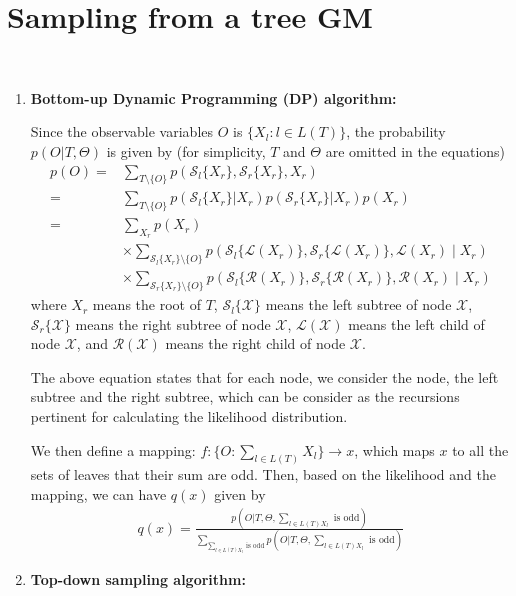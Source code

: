 \documentclass[11pt]{extarticle}
\newcommand{\0}{\mathbf{0}}
\renewcommand{\(}{\left(}
\renewcommand{\)}{\right)}
\theoremstyle{definition}
\begin{document}
\newpage
\section{Sampling from a tree GM}
\noindent{} \\
\begin{enumerate}
\item \textbf{Bottom-up Dynamic Programming (DP) algorithm:}
\par Since the observable variables $O$ is $\{X_{l}: l \in L(T)\}$, the probability $p(O \vert T, \Theta)$ is given by (for simplicity, $T$ and $\Theta$ are omitted in the equations)
\begin{align*}
	p(O) =& \sum_{T \setminus \{O\}} p(\mathcal{S}_{l}\{X_{r}\}, \mathcal{S}_{r}\{X_{r}\}, X_{r}) \\
	=& \sum_{T \setminus \{O\}} p(\mathcal{S}_{l}\{X_{r}\} \vert X_{r}) p(\mathcal{S}_{r}\{X_{r}\} \vert X_{r}) p(X_{r}) \\
	=& \sum_{X_{r}} p(X_{r}) \\ 
	 & \times \sum_{\mathcal{S}_{l}\{X_{r}\}\setminus\{O\}} p(\mathcal{S}_{l}\{\mathcal{L}(X_{r})\}, \mathcal{S}_{r}\{\mathcal{L}(X_{r})\}, \mathcal{L}(X_{r}) \mid X_{r}) \\
	 & \times \sum_{\mathcal{S}_{r}\{X_{r}\}\setminus\{O\}} p(\mathcal{S}_{l}\{\mathcal{R}(X_{r})\}, \mathcal{S}_{r}\{\mathcal{R}(X_{r})\}, \mathcal{R}(X_{r}) \mid X_{r})
\end{align*}
where $X_{r}$ means the root of $T$, $\mathcal{S}_{l}\{\mathcal{X}\}$ means the left subtree of node $\mathcal{X}$, $\mathcal{S}_{r}\{\mathcal{X}\}$ means the right subtree of node $\mathcal{X}$, $\mathcal{L}(\mathcal{X})$ means the left child of node $\mathcal{X}$, and $\mathcal{R}(\mathcal{X})$ means the right child of node $\mathcal{X}$.
\par The above equation states that for each node, we consider the node, the left subtree and the right subtree, which can be consider as the recursions pertinent for calculating the likelihood distribution.
\par We then define a mapping: $f : \{O: \sum_{l\in L(T)}X_{l}\} \rightarrow x$, which maps $x$ to all the sets of leaves that their sum are odd. Then, based on the likelihood and the mapping, we can have $q(x)$ given by
\begin{align*}
	q(x) = \frac{p\left(O \vert T, \Theta, \sum_{l\in L(T)X_{l}}\mbox{ is odd}\right)}{\sum_{\sum_{l\in L(T)X_{l}}\mbox{ is odd}} p\left(O \vert T, \Theta, \sum_{l\in L(T)X_{l}}\mbox{ is odd}\right)}
\end{align*}

\item \textbf{Top-down sampling algorithm:}
\end{enumerate}
\end{document}
